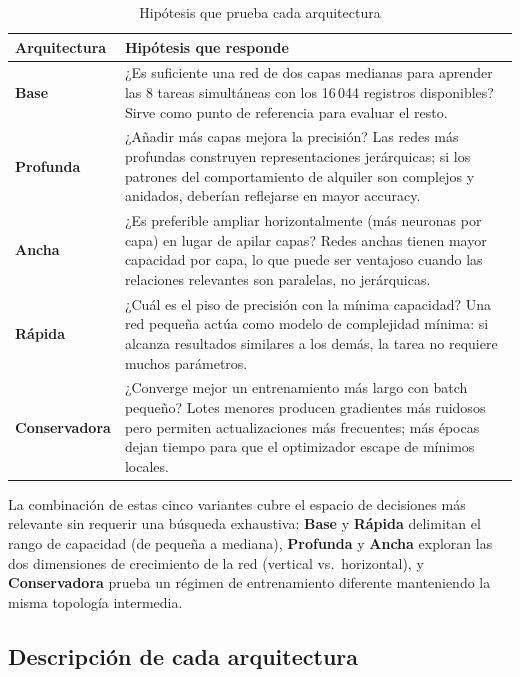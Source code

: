 \documentclass[12pt, a4paper]{report}
\newcommand{\modelo}[1]{\textbf{#1}}
\begin{document}
\begin{table}[H]
\centering
\caption{Hipótesis que prueba cada arquitectura}
\label{tab:hipotesis}
\begin{tabular}{@{} l p{10cm} @{}}
\toprule
\textbf{Arquitectura} & \textbf{Hipótesis que responde} \\
\midrule
\modelo{Base}         & ¿Es suficiente una red de dos capas medianas para aprender las 8 tareas simultáneas con los 16\,044 registros disponibles? Sirve como punto de referencia para evaluar el resto. \\
\modelo{Profunda}     & ¿Añadir más capas mejora la precisión? Las redes más profundas construyen representaciones jerárquicas; si los patrones del comportamiento de alquiler son complejos y anidados, deberían reflejarse en mayor accuracy. \\
\modelo{Ancha}        & ¿Es preferible ampliar horizontalmente (más neuronas por capa) en lugar de apilar capas? Redes anchas tienen mayor capacidad por capa, lo que puede ser ventajoso cuando las relaciones relevantes son paralelas, no jerárquicas. \\
\modelo{Rápida}       & ¿Cuál es el piso de precisión con la mínima capacidad? Una red pequeña actúa como modelo de complejidad mínima: si alcanza resultados similares a los demás, la tarea no requiere muchos parámetros. \\
\modelo{Conservadora} & ¿Converge mejor un entrenamiento más largo con batch pequeño? Lotes menores producen gradientes más ruidosos pero permiten actualizaciones más frecuentes; más épocas dejan tiempo para que el optimizador escape de mínimos locales. \\
\bottomrule
\end{tabular}
\end{table}

La combinación de estas cinco variantes cubre el espacio de decisiones más relevante sin requerir una búsqueda exhaustiva: \modelo{Base} y \modelo{Rápida} delimitan el rango de capacidad (de pequeña a mediana), \modelo{Profunda} y \modelo{Ancha} exploran las dos dimensiones de crecimiento de la red (vertical vs.\ horizontal), y \modelo{Conservadora} prueba un régimen de entrenamiento diferente manteniendo la misma topología intermedia.

\subsection{Descripción de cada arquitectura}
\end{document}
